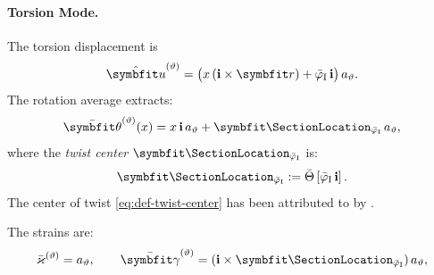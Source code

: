\paragraph{Torsion Mode.}

The torsion displacement is
\begin{equation*}
\hat{\bm{u}}^{(\vartheta)} = \big( x\,(\FrameBasis \times \bm{r}) 
+ \WarpTwistIesan\,\FrameBasis \big)\,a_\vartheta.
\end{equation*}
The rotation average extracts:
\begin{equation*}
\bar{\bm{\theta}}^{(\vartheta)}(x) = x\,\FrameBasis\,a_\vartheta 
+ \CenterTwistLocation\,a_\vartheta,
\end{equation*}
where the \emph{twist center} $\CenterTwistLocation$ is:
\begin{equation}
\CenterTwistLocation := \RotationAverage{\WarpTwistIesan\,\FrameBasis}.
\label{eq:def-twist-center}
\end{equation}
The center of twist \eqref{eq:def-twist-center} has been attributed to \cite{trefftz1935uber} by \cite{pilkey2003analysis,romano2012torsion}.

The strains are:
\begin{equation*}
\bar{\varkappa}^{(\vartheta)} = a_\vartheta, 
\qquad 
\bar{\bm{\gamma}}^{(\vartheta)} = (\FrameBasis \times \CenterTwistLocation)\,a_\vartheta,
\end{equation*}


